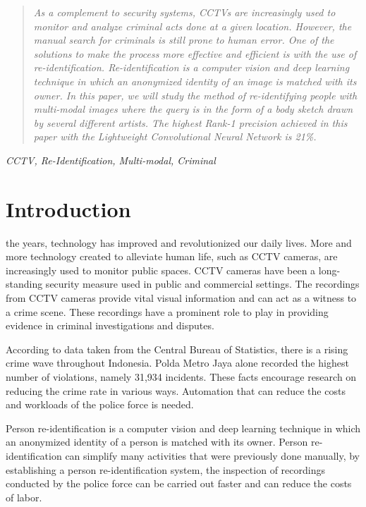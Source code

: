 \documentclass[conference]{IEEEtran}
\begin{document}
	\begin{abstract}
		\textit{As a complement to security systems, CCTVs are increasingly used to monitor and analyze criminal acts done at a given location. However, the manual search for criminals is still prone to human error. One of the solutions to make the process more effective and efficient is with the use of re-identification.
		Re-identification is a computer vision and deep learning technique in which an anonymized identity of an image is matched with its owner. In this paper, we will study the method of re-identifying people with multi-modal images where the query is in the form of a body sketch drawn by several different artists. The highest Rank-1 precision achieved in this paper with the Lightweight Convolutional Neural Network is 21\%.}
		
	\end{abstract}
	\begin{IEEEkeywords}
		\textit{CCTV, Re-Identification, Multi-modal, Criminal}
	\end{IEEEkeywords}
	
	\section{Introduction}
	 the years, technology has improved and revolutionized our daily lives. More and more technology created to alleviate human life, such as CCTV cameras, are increasingly used to monitor public spaces. CCTV cameras have been a long-standing security measure used in public and commercial settings. The recordings from CCTV cameras provide vital visual information and can act as a witness to a crime scene. These recordings have a prominent role to play in providing evidence in criminal investigations and disputes.
	
	\vspace{1ex}
	
	According to data taken from the Central Bureau of Statistics, there is a rising crime wave throughout Indonesia. Polda Metro Jaya alone recorded the highest number of violations, namely 31,934 incidents\cite{cit:1, cit:2, cit:3, cit:4}. These facts encourage research on reducing the crime rate in various ways. Automation that can reduce the costs and workloads of the police force is needed. 
	
	\vspace{1ex}
	
	Person re-identification is a computer vision and deep learning technique in which an anonymized identity of a person is matched with its owner. Person re-identification can simplify many activities that were previously done manually, by establishing a person re-identification system, the inspection of recordings conducted by the police force can be carried out faster and can reduce the costs of labor.
	
\end{document}
